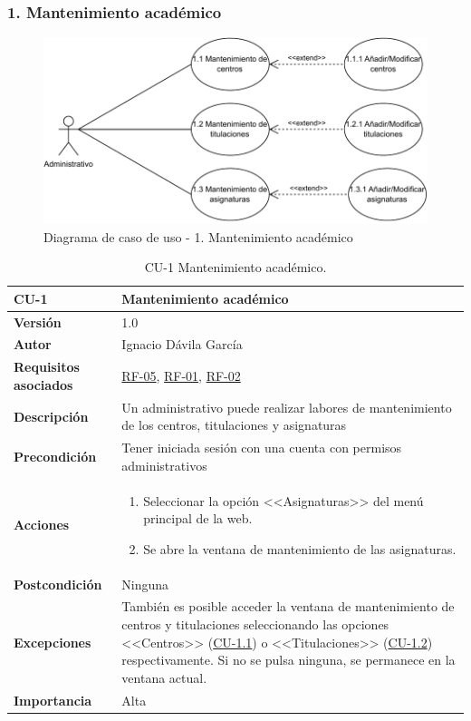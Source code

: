 \subsubsection{1. Mantenimiento académico}
\begin{figure}[!h]
	\centering
	\includegraphics[scale=0.85]{../img/Anexos/Casos uso/Diagrama casos de uso 2.pdf}
	\caption{Diagrama de caso de uso - 1. Mantenimiento académico}
\end{figure}
\FloatBarrier

\begin{table}[p]
\label{table:CU-1}
	\centering
	\begin{tabularx}{\linewidth}{ p{} p{} }
		\toprule
		\textbf{CU-1}    & \textbf{Mantenimiento académico}\\
		\toprule
		\textbf{Versión}              & 1.0    \\
		\textbf{Autor}                & Ignacio Dávila García \\
		\textbf{Requisitos asociados} & \hyperref[itm:RF5]{RF-05}, \hyperref[itm:RF1]{RF-01}, \hyperref[itm:RF2]{RF-02} \\
		\textbf{Descripción}          & Un administrativo puede realizar labores de mantenimiento de los centros, titulaciones y asignaturas \\
		\textbf{Precondición}         & Tener iniciada sesión con una cuenta con permisos administrativos \\
		\textbf{Acciones}             &
		\begin{enumerate}
			\def\labelenumi{\arabic{enumi}.}
			\tightlist
			\item Seleccionar la opción <<Asignaturas>> del menú principal de la web.
			\item Se abre la ventana de mantenimiento de las asignaturas.
		\end{enumerate}\\
		\textbf{Postcondición}        & Ninguna \\
		\textbf{Excepciones}          & También es posible acceder la ventana de mantenimiento de centros y titulaciones seleccionando las opciones <<Centros>> (\hyperref[table:CU-1.1]{CU-1.1}) o <<Titulaciones>> (\hyperref[table:CU-1.2]{CU-1.2}) respectivamente. Si no se pulsa ninguna, se permanece en la ventana actual. \\
		\textbf{Importancia}          & Alta \\
		\bottomrule
	\end{tabularx}
	\caption{CU-1 Mantenimiento académico.}
\end{table}
\FloatBarrier

